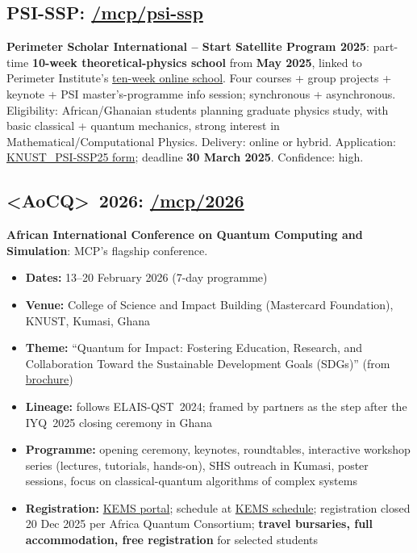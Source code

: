 \documentclass[11pt,a4paper]{article}
\begin{document}
\subsection{PSI-SSP: \href{https://physics.knust.edu.gh/mcp/psi-ssp}{/mcp/psi-ssp}}
\textbf{Perimeter Scholar International -- Start Satellite Program 2025}: part-time \textbf{10-week theoretical-physics school} from \textbf{May 2025}, linked to Perimeter Institute's \href{https://perimeterinstitute.ca/ten-week-online-school}{ten-week online school}. Four courses + group projects + keynote + PSI master's-programme info session; synchronous + asynchronous. Eligibility: African/Ghanaian students planning graduate physics study, with basic classical + quantum mechanics, strong interest in Mathematical/Computational Physics. Delivery: online or hybrid. Application: \href{https://bit.ly/KNUST_PSI-SSP25_ApplicationForms}{KNUST\_PSI-SSP25 form}; deadline \textbf{30 March 2025}. Confidence: high.

\subsection{\textless AoC\textbar Q\textgreater\ 2026: \href{https://physics.knust.edu.gh/mcp/2026}{/mcp/2026}}
\textbf{African International Conference on Quantum Computing and Simulation}: MCP's flagship conference.

\begin{itemize}[leftmargin=1.4em]
  \item \textbf{Dates:} 13--20 February 2026 (7-day programme)
  \item \textbf{Venue:} College of Science and Impact Building (Mastercard Foundation), KNUST, Kumasi, Ghana
  \item \textbf{Theme:} ``Quantum for Impact: Fostering Education, Research, and Collaboration Toward the Sustainable Development Goals (SDGs)'' (from \href{https://physics.knust.edu.gh/aociq-conference-2026-brouchure}{brochure})
  \item \textbf{Lineage:} follows ELAIS-QST~2024; framed by partners as the step after the IYQ~2025 closing ceremony in Ghana
  \item \textbf{Programme:} opening ceremony, keynotes, roundtables, interactive workshop series (lectures, tutorials, hands-on), SHS outreach in Kumasi, poster sessions, focus on classical-quantum algorithms of complex systems
  \item \textbf{Registration:} \href{https://kems.knust.edu.gh/event/50/registrations/24/}{KEMS portal}; schedule at \href{https://kems.knust.edu.gh/event/50/page/4-schedule}{KEMS schedule}; registration closed 20 Dec 2025 per Africa Quantum Consortium; \textbf{travel bursaries, full accommodation, free registration} for selected students
\end{itemize}
\end{document}
